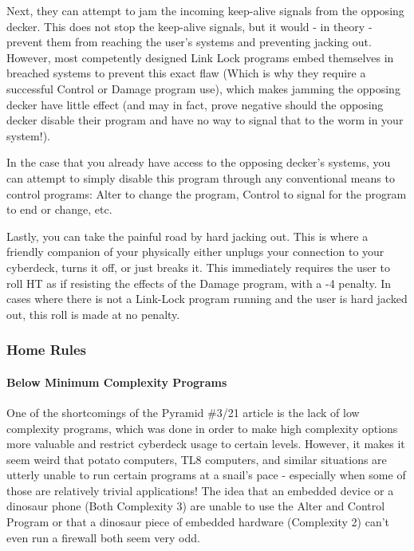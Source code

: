 \begin{multicols}{3}
	Next, they can attempt to jam the incoming keep-alive signals from the opposing decker. This does not stop the keep-alive signals, but it would - in theory - prevent them from reaching the user's systems and preventing jacking out. However, most competently designed Link Lock programs embed themselves in breached systems to prevent this exact flaw (Which is why they require a successful Control or Damage program use), which makes jamming the opposing decker have little effect (and may in fact, prove negative should the opposing decker disable their program and have no way to signal that to the worm in your system!).
	
	In the case that you already have access to the opposing decker's systems, you can attempt to simply disable this program through any conventional means to control programs: Alter to change the program, Control to signal for the program to end or change, etc.
	
	Lastly, you can take the painful road by hard jacking out. This is where a friendly companion of your physically either unplugs your connection to your cyberdeck, turns it off, or just breaks it. This immediately requires the user to roll HT as if resisting the effects of the Damage program, with a -4 penalty. In cases where there is not a Link-Lock program running and the user is hard jacked out, this roll is made at no penalty.
	
	\subsubsection{Home Rules}
	
	\paragraph{Below Minimum Complexity Programs}\label{low_complexity}
	
	One of the shortcomings of the Pyramid \#3/21 article is the lack of low complexity programs, which was done in order to make high complexity options more valuable and restrict cyberdeck usage to certain levels. However, it makes it seem weird that potato computers, TL8 computers, and similar situations are utterly unable to run certain programs at a snail's pace - especially when some of those are relatively trivial applications! The idea that an embedded device or a dinosaur phone (Both Complexity 3) are unable to use the Alter and Control Program or that a dinosaur piece of embedded hardware (Complexity 2) can't even run a firewall both seem very odd.
	

\end{multicols}
